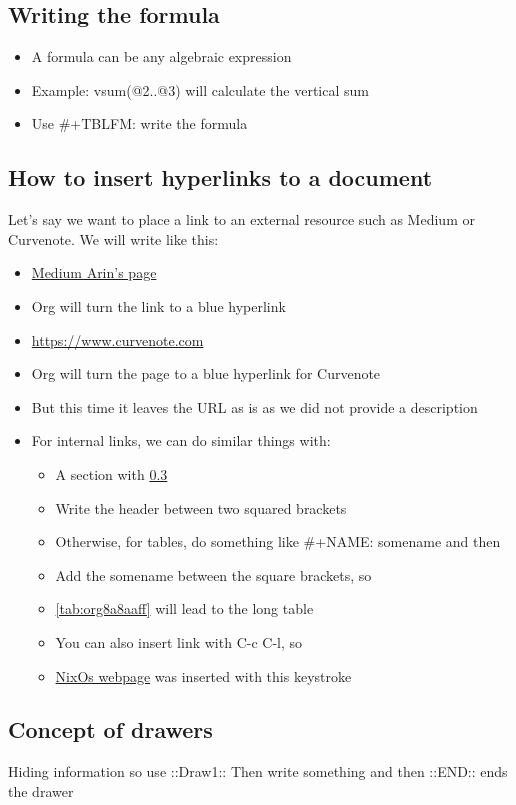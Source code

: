 \documentclass[11pt]{article}
\begin{document}
\subsection{Writing the formula}
\label{sec:org7f74258}
\begin{itemize}
\item A formula can be any algebraic expression
\item Example: vsum(@2..@3) will calculate the vertical sum
\item Use \#+TBLFM: write the formula
\end{itemize}

\subsection{How to insert hyperlinks to a document}
\label{sec:org3acfea5}
Let's say we want to place a link to an external resource such as Medium or Curvenote. We will write like this:
\begin{itemize}
\item \href{https://medium.com/@arinbasu}{Medium Arin's page}
\item Org will turn the link to a blue hyperlink
\item \url{https://www.curvenote.com}
\item Org will turn the page to a blue hyperlink for Curvenote
\item But this time it leaves the URL as is as we did not provide a description
\item For internal links, we can do similar things with:
\begin{itemize}
\item A section with \ref{sec:org7ddcdd0}
\item Write the header between two squared brackets
\item Otherwise, for tables, do something like \#+NAME: somename and then
\item Add the somename between the square brackets, so
\item \ref{tab:org8a8aaff} will lead to the long table
\item You can also insert link with C-c C-l, so
\item \href{https://www.nixos.org}{NixOs webpage} was inserted with this keystroke
\end{itemize}
\end{itemize}


\subsection{Concept of drawers}
\label{sec:org7ddcdd0}
Hiding information so use
::Draw1::
Then write something and then
::END::
ends the drawer
\end{document}

